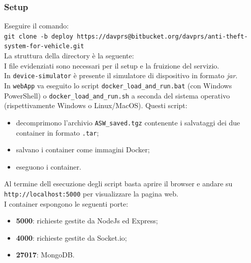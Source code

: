 \documentclass{report}
\begin{document}
\subsubsection{Setup}
Eseguire il comando:\\
\texttt{git clone -b deploy https://davprs@bitbucket.org/davprs/anti-theft-system-for-vehicle.git}\\
\newline
La struttura della directory è la seguente:\\
\hfill \break
I file evidenziati sono necessari per il setup e la fruizione del servizio.\\\break
In \texttt{device-simulator} è presente il simulatore di dispositivo in formato \textit{jar}.\\
In \texttt{webApp} va eseguito lo script \texttt{docker\_load\_and\_run.bat} (con Windows PowerShell) o \texttt{docker\_load\_and\_run.sh} a seconda del sistema operativo (rispettivamente Windows o Linux/MacOS). Questi script:
\begin{itemize}
    \item decomprimono l'archivio \texttt{ASW\_saved.tgz} contenente i salvataggi dei due container in formato \texttt{.tar};
    \item salvano i container come immagini Docker;
    \item eseguono i container.
\end{itemize}
Al termine dell esecuzione degli script basta aprire il browser e andare su \texttt{http://localhost:5000} per visualizzare la pagina web.\\
I container espongono le seguenti porte:
\begin{itemize}
    \item \textbf{5000}: richieste gestite da NodeJs ed Express;
    \item \textbf{4000}: richieste gestite da Socket.io;
    \item \textbf{27017}: MongoDB.
\end{itemize}
\end{document}
